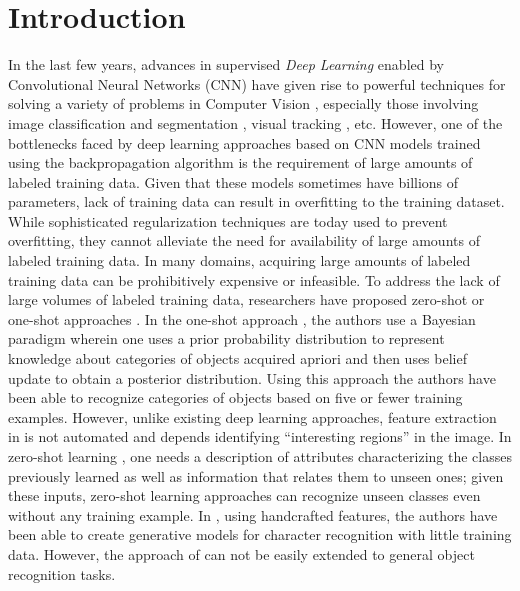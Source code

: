 \documentclass[conference]{IEEEtran}
\begin{document}
\section{Introduction}
 In the last few years, advances in  supervised \emph{Deep Learning} \cite{lecundeep} enabled by   Convolutional Neural Networks (CNN) \cite{krizhevsky2012imagenet} have given rise to  powerful  techniques for  solving a variety of problems in  Computer Vision \cite{nam2016learning,ciregan2012multi,gidaris2015object}, especially those involving  image classification and segmentation \cite{hariharan,hariharan1, deepsat, ieeetran,urtasun1,texture, character, texture1, ciregan2012multi,he2016deep,girshick2014rich,krizhevsky2012imagenet,chen2018deeplab}, visual tracking \cite{tracking}, etc. However, one of the bottlenecks faced by deep learning approaches based on CNN models trained using the backpropagation algorithm is the requirement of large amounts of labeled training data. Given that these models sometimes have billions of parameters, lack of  training data can result in overfitting  to the training dataset. While sophisticated regularization techniques \cite{Hastie} are today used to prevent overfitting, they cannot alleviate the need for availability of large amounts of labeled  training data. In many domains, acquiring large amounts of labeled training data can be prohibitively expensive or infeasible. To address the lack of large volumes of labeled training data, researchers have proposed zero-shot or one-shot approaches \cite{zeroshotRomero,ZeroshotNg,Oneshot}. In the one-shot approach \cite{Oneshot}, the authors use a Bayesian paradigm wherein  one  uses a prior probability distribution to represent  knowledge about categories of objects acquired apriori and then uses belief update to obtain a posterior distribution. Using this approach the authors have been able to recognize categories of objects based on five or fewer training examples.  However, unlike existing deep learning approaches, feature extraction in \cite{Oneshot} is not automated and depends identifying ``interesting regions'' in the image. In zero-shot learning \cite{zeroshotRomero,ZeroshotNg}, one needs a description of attributes characterizing the classes previously learned as well as information that relates them to unseen ones; given these inputs, zero-shot learning approaches can recognize unseen classes even without any training example.  In \cite{Vicarious}, using handcrafted features, the authors have been able to create generative models for character recognition  with little training data. However, the approach of \cite{Vicarious} can  not  be easily extended to general object recognition tasks.  
 
\end{document}
